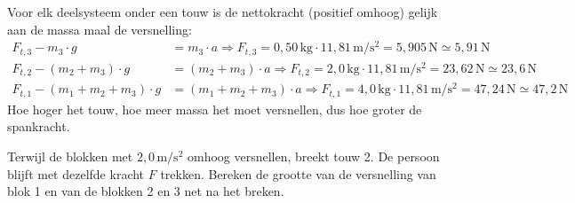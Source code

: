 \documentclass{ximera}
\newcommand{\blokje}[4][left]{\fill (#2,#3) circle (0.05); \node[#1, inner sep=3pt] at (#2,#3) {#4};}
\newcommand{\kr}[7][kracht]{\draw[#1] (#2,#3) -- ++(#4,#5) node[#6] {#7};}
\newcommand{\positiepijl}[6]{\draw[positie, draw=black!50, text=black!50] (#1,#2) -- ++(#3,#4) node[#5] {#6};}
\begin{document}
\begin{exercise}
\begin{question}
\begin{solution}
            \begin{center}
            \end{center}

            Voor elk deelsysteem onder een touw is de nettokracht (positief omhoog) gelijk aan de massa maal de versnelling:
            \begin{align*}
                F_{t,3} - m_{3} \cdot g &= m_{3} \cdot a \Rightarrow F_{t,3} = 0{,}50 \, \mathrm{kg} \cdot 11{,}81 \, \mathrm{m/s^2} = 5{,}905 \, \mathrm{N} \simeq 5{,}91 \, \mathrm{N} \\
                F_{t,2} - (m_{2}+m_{3}) \cdot g &= (m_{2}+m_{3}) \cdot a \Rightarrow F_{t,2} = 2{,}0 \, \mathrm{kg} \cdot 11{,}81 \, \mathrm{m/s^2} = 23{,}62 \, \mathrm{N} \simeq 23{,}6 \, \mathrm{N} \\
                F_{t,1} - (m_{1}+m_{2}+m_{3}) \cdot g &= (m_{1}+m_{2}+m_{3}) \cdot a \Rightarrow F_{t,1} = 4{,}0 \, \mathrm{kg} \cdot 11{,}81 \, \mathrm{m/s^2} = 47{,}24 \, \mathrm{N} \simeq 47{,}2 \, \mathrm{N}
            \end{align*}
            Hoe hoger het touw, hoe meer massa het moet versnellen, dus hoe groter de spankracht.
        \end{solution}
    \end{question}

    \begin{question}
        Terwijl de blokken met $2{,}0 \, \mathrm{m/s^2}$ omhoog versnellen, breekt touw 2. De persoon blijft met dezelfde kracht $F$ trekken. Bereken de grootte van de versnelling van blok 1 en van de blokken 2 en 3 net na het breken.


\end{question}
\end{exercise}
\end{document}
